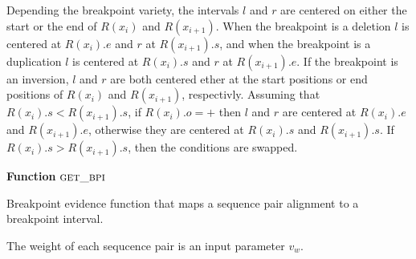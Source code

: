 \documentclass[11pt]{article}
\begin{document}
Depending the breakpoint variety, the intervals $l$ and $r$ are centered on
either the start or the end of $R(x_i)$ and $R(x_{i+1})$.  When the breakpoint
is a deletion $l$ is centered at $R(x_i).e$ and $r$ at $R(x_{i+1}).s$, and when
the breakpoint is a duplication $l$ is centered at $R(x_i).s$ and $r$ at
$R(x_{i+1}).e$.  If the breakpoint is an inversion, $l$ and $r$ are both 
centered ether at the start positions or end positions of $R(x_i)$ and
$R(x_{i+1})$, respectivly.  Assuming that $R(x_i).s<R(x_{i+1}).s$, if
$R(x_i).o=+$ then $l$ and $r$ are centered at $R(x_i).e$ and  $R(x_{i+1}).e$,
otherwise they are centered at $R(x_i).s$ and  $R(x_{i+1}).s$.  If
$R(x_i).s>R(x_{i+1}).s$, then the conditions are swapped.


\begin{algorithm}[H]
    \DontPrintSemicolon
    \footnotesize
    \BlankLine
    \textbf{Function} $\textsc{get\_bpi}$\;
	\caption{Breakpoint evidence function that maps a sequence pair alignment to
			a breakpoint interval.}
    \label{get_bp_sr}
\end{algorithm}


The weight of each sequcence pair is an input parameter $v_w$.
\end{document}
